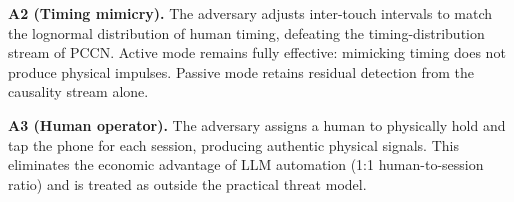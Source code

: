 \noindent\textbf{A2 (Timing mimicry).}
The adversary adjusts inter-touch intervals to match the lognormal distribution of
human timing, defeating the timing-distribution stream of PCCN.%
Active mode remains fully effective: mimicking timing does not produce physical impulses.%
Passive mode retains residual detection from the causality stream alone.%

\noindent\textbf{A3 (Human operator).}
The adversary assigns a human to physically hold and tap the phone for each session,
producing authentic physical signals.%
This eliminates the economic advantage of LLM automation (1:1 human-to-session ratio)
and is treated as outside the practical threat model.%
